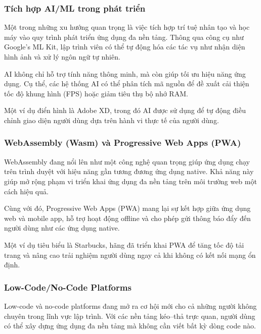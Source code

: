 \subsubsection{Tích hợp AI/ML trong phát triển}

Một trong những xu hướng quan trọng là việc tích hợp trí tuệ nhân tạo và học máy vào quy trình phát triển ứng dụng đa nền tảng.  
Thông qua công cụ như Google’s ML Kit, lập trình viên có thể tự động hóa các tác vụ như nhận diện hình ảnh và xử lý ngôn ngữ tự nhiên.

AI không chỉ hỗ trợ tính năng thông minh, mà còn giúp tối ưu hiệu năng ứng dụng.  
Cụ thể, các hệ thống AI có thể phân tích mã nguồn để đề xuất cải thiện tốc độ khung hình (FPS) hoặc giảm tiêu thụ bộ nhớ RAM.

Một ví dụ điển hình là Adobe XD, trong đó AI được sử dụng để tự động điều chỉnh giao diện người dùng dựa trên hành vi thực tế của người dùng.

\vspace{0.5cm}

\subsubsection{WebAssembly (Wasm) và Progressive Web Apps (PWA)}

WebAssembly đang nổi lên như một công nghệ quan trọng giúp ứng dụng chạy trên trình duyệt với hiệu năng gần tương đương ứng dụng native.  
Khả năng này giúp mở rộng phạm vi triển khai ứng dụng đa nền tảng trên môi trường web một cách hiệu quả.

Cùng với đó, Progressive Web Apps (PWA) mang lại sự kết hợp giữa ứng dụng web và mobile app,  
hỗ trợ hoạt động offline và cho phép gửi thông báo đẩy đến người dùng như các ứng dụng native.

Một ví dụ tiêu biểu là Starbucks, hãng đã triển khai PWA để tăng tốc độ tải trang và nâng cao trải nghiệm người dùng ngay cả khi không có kết nối mạng ổn định.

\vspace{0.5cm}

\subsubsection{Low-Code/No-Code Platforms}

Low-code và no-code platforms đang mở ra cơ hội mới cho cả những người không chuyên trong lĩnh vực lập trình.  
Với các nền tảng kéo–thả trực quan, người dùng có thể xây dựng ứng dụng đa nền tảng mà không cần viết bất kỳ dòng code nào.


